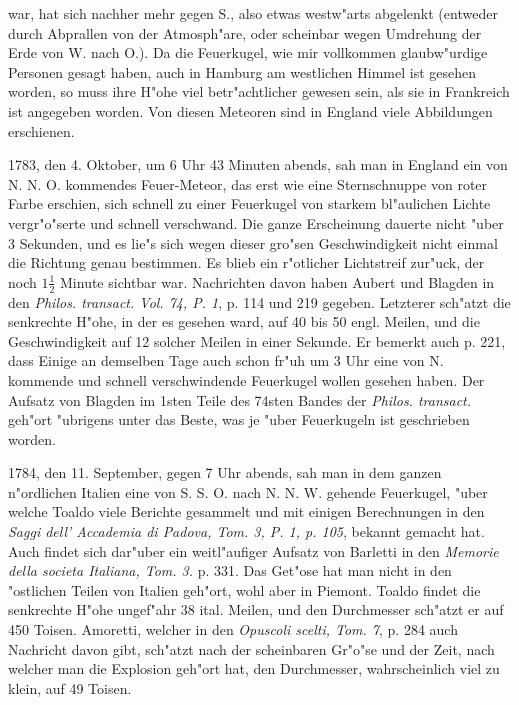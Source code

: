 \documentclass[a4paper, 11pt, oneside, polutonikogreek, german]{article}
\begin{document}
war, hat sich nachher mehr gegen S., also etwas westw"arts abgelenkt (entweder durch Abprallen von der Atmosph"are, oder scheinbar wegen Umdrehung der Erde von W. nach O.). Da die Feuerkugel, wie mir vollkommen glaubw"urdige Personen gesagt haben, auch in Hamburg am westlichen Himmel ist gesehen worden, so muss ihre H"ohe viel betr"achtlicher gewesen sein, als sie in Frankreich ist angegeben worden. Von diesen Meteoren sind in England viele Abbildungen erschienen.

1783, den 4. Oktober, um 6 Uhr 43 Minuten abends, sah man in England ein von N. N. O. kommendes Feuer-Meteor, das erst wie eine Sternschnuppe von roter Farbe erschien, sich schnell zu einer Feuerkugel von starkem bl"aulichen Lichte vergr"o"serte und schnell verschwand. Die ganze Erscheinung dauerte nicht "uber 3 Sekunden, und es lie"s sich wegen dieser gro"sen Geschwindigkeit nicht einmal die Richtung genau bestimmen. Es blieb ein r"otlicher Lichtstreif zur"uck, der noch $\mathfrak{1\frac{1}{2}}$ Minute sichtbar war. Nachrichten davon haben Aubert und Blagden in den \emph{Philos. transact. Vol. 74, P. 1}, p. 114 und 219 gegeben. Letzterer sch"atzt die senkrechte H"ohe, in der es gesehen ward, auf 40 bis 50 engl. Meilen, und die Geschwindigkeit auf 12 solcher Meilen in einer Sekunde. Er bemerkt auch p. 221, dass Einige an demselben Tage auch schon fr"uh um 3 Uhr eine von N. kommende und schnell verschwindende Feuerkugel wollen gesehen haben. Der Aufsatz von Blagden im 1sten Teile des 74sten Bandes der \emph{Philos. transact.} geh"ort "ubrigens unter das Beste, was je "uber Feuerkugeln ist geschrieben worden.

1784, den 11. September, gegen 7 Uhr abends, sah man in dem ganzen n"ordlichen Italien eine von S. S. O. nach N. N. W. gehende Feuerkugel, "uber welche Toaldo viele Berichte gesammelt und mit einigen Berechnungen in den \emph{Saggi dell' Accademia di Padova, Tom. 3, P. 1, p. 105}, bekannt gemacht hat. Auch findet sich dar"uber ein weitl"aufiger Aufsatz von Barletti in den \emph{Memorie della societa Italiana, Tom. 3.} p. 331. Das Get"ose hat man nicht in den "ostlichen Teilen von Italien geh"ort, wohl aber in Piemont. Toaldo findet die senkrechte H"ohe ungef"ahr 38 ital. Meilen, und den Durchmesser sch"atzt er auf 450 Toisen. Amoretti, welcher in den \emph{Opuscoli scelti, Tom. 7}, p. 284 auch Nachricht davon gibt, sch"atzt nach der scheinbaren Gr"o"se und der Zeit, nach welcher man die Explosion geh"ort hat, den Durchmesser, wahrscheinlich viel zu klein, auf 49 Toisen.
\end{document}
